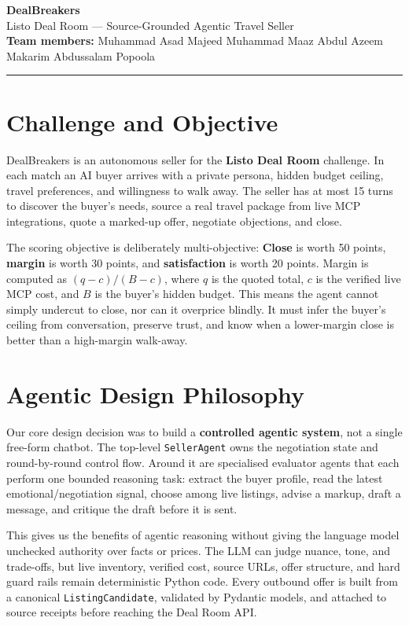 \documentclass[10pt,a4paper]{article}
\begin{document}
\begin{center}
  {\LARGE\bfseries\color{accent} DealBreakers}\\[4pt]
  {\large Listo Deal Room --- Source-Grounded Agentic Travel Seller}\\[6pt]
  \textbf{Team members:}
  Muhammad Asad Majeed \textbullet{}
  Muhammad Maaz \textbullet{}
  Abdul Azeem Makarim \textbullet{}
  Abdussalam Popoola
\end{center}

\vspace{4pt}
\hrule
\vspace{6pt}

\section*{Challenge and Objective}
DealBreakers is an autonomous seller for the \textbf{Listo Deal Room} challenge. In each match an AI buyer arrives with a private persona, hidden budget ceiling, travel preferences, and willingness to walk away. The seller has at most 15 turns to discover the buyer's needs, source a real travel package from live MCP integrations, quote a marked-up offer, negotiate objections, and close.

The scoring objective is deliberately multi-objective: \textbf{Close} is worth 50 points, \textbf{margin} is worth 30 points, and \textbf{satisfaction} is worth 20 points. Margin is computed as $(q - c) / (B - c)$, where $q$ is the quoted total, $c$ is the verified live MCP cost, and $B$ is the buyer's hidden budget. This means the agent cannot simply undercut to close, nor can it overprice blindly. It must infer the buyer's ceiling from conversation, preserve trust, and know when a lower-margin close is better than a high-margin walk-away.

\section*{Agentic Design Philosophy}
Our core design decision was to build a \textbf{controlled agentic system}, not a single free-form chatbot. The top-level \texttt{SellerAgent} owns the negotiation state and round-by-round control flow. Around it are specialised evaluator agents that each perform one bounded reasoning task: extract the buyer profile, read the latest emotional/negotiation signal, choose among live listings, advise a markup, draft a message, and critique the draft before it is sent.

This gives us the benefits of agentic reasoning without giving the language model unchecked authority over facts or prices. The LLM can judge nuance, tone, and trade-offs, but live inventory, verified cost, source URLs, offer structure, and hard guard rails remain deterministic Python code. Every outbound offer is built from a canonical \texttt{ListingCandidate}, validated by Pydantic models, and attached to source receipts before reaching the Deal Room API.
\end{document}
